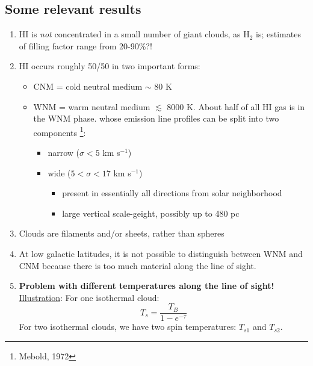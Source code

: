 \documentclass[11pt]{article}
\newcommand{\mar}[1]{\hspace{0pt}\marginpar{-\textcolor{black}{#1}-}}
\begin{document}
\subsection{Some relevant results}
\begin{enumerate}[itemsep=1ex]
    \item \mar{47}HI is \emph{not} concentrated in a small number of giant
        clouds, as H$_{2}$ is; estimates of filling factor range from 20-90\%?!
    \item HI occurs roughly 50/50 in two important forms:
        \begin{itemize}[itemsep=0.5mm]
            \item CNM = cold neutral medium $\sim$ 80 K
            \item WNM = warm neutral medium $\lesssim$ 8000 K.
                About half of all HI gas is in the WNM phase. whose emission
                line profiles can be split into two components
                \footnote{Mebold, 1972}:
                \begin{itemize}
                    \item narrow ($\sigma < 5$ km s$^{-1}$)
                    \item wide ($5 < \sigma < 17$ km s$^{-1}$)
                        \begin{itemize}
                            \item present in essentially all directions from
                                solar neighborhood
                            \item large vertical scale-geight, possibly up to
                                480 pc
                        \end{itemize}
                \end{itemize}
        \end{itemize}
    \item Clouds are filaments and/or sheets, rather than spheres
    \item At low galactic latitudes, it is not possible to distinguish between
        WNM and CNM because there is too much material along the line of sight.
    \item \textbf{Problem with different temperatures along the line of sight!}
        \underline{Illustration}: For one isothermal cloud:
        \[
            T_{s} = \frac{T_{B}}{1 - e^{-\tau}}
            \]
        For two isothermal clouds, we have two spin temperatures:
        $T_{s1}$ and $T_{s2}$.


\end{enumerate}
\end{document}

